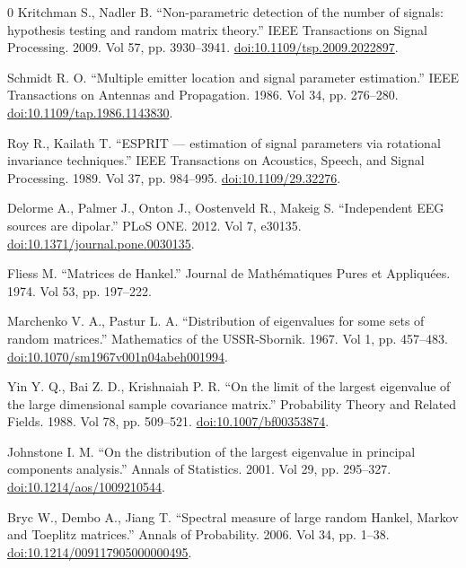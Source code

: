 \documentclass{article}
\begin{document}
\begin{thebibliography}{0}
 Kritchman S., Nadler B. ``Non-parametric detection of the number of signals: hypothesis testing and random matrix theory.'' IEEE Transactions on Signal Processing. 2009. Vol 57, pp. 3930--3941. \href{https://doi.org/10.1109/tsp.2009.2022897}{doi:10.1109/tsp.2009.2022897}.

 Schmidt R. O. ``Multiple emitter location and signal parameter estimation.'' IEEE Transactions on Antennas and Propagation. 1986. Vol 34, pp. 276--280. \href{https://doi.org/10.1109/tap.1986.1143830}{doi:10.1109/tap.1986.1143830}.

 Roy R., Kailath T. ``ESPRIT --- estimation of signal parameters via rotational invariance techniques.'' IEEE Transactions on Acoustics, Speech, and Signal Processing. 1989. Vol 37, pp. 984--995. \href{https://doi.org/10.1109/29.32276}{doi:10.1109/29.32276}.

 Delorme A., Palmer J., Onton J., Oostenveld R., Makeig S. ``Independent EEG sources are dipolar.'' PLoS ONE. 2012. Vol 7, e30135. \href{https://doi.org/10.1371/journal.pone.0030135}{doi:10.1371/journal.pone.0030135}.

 Fliess M. ``Matrices de Hankel.'' Journal de Math\'ematiques Pures et Appliqu\'ees. 1974. Vol 53, pp. 197--222.

 Marchenko V. A., Pastur L. A. ``Distribution of eigenvalues for some sets of random matrices.'' Mathematics of the USSR-Sbornik. 1967. Vol 1, pp. 457--483. \href{https://doi.org/10.1070/sm1967v001n04abeh001994}{doi:10.1070/sm1967v001n04abeh001994}.

 Yin Y. Q., Bai Z. D., Krishnaiah P. R. ``On the limit of the largest eigenvalue of the large dimensional sample covariance matrix.'' Probability Theory and Related Fields. 1988. Vol 78, pp. 509--521. \href{https://doi.org/10.1007/bf00353874}{doi:10.1007/bf00353874}.

 Johnstone I. M. ``On the distribution of the largest eigenvalue in principal components analysis.'' Annals of Statistics. 2001. Vol 29, pp. 295--327. \href{https://doi.org/10.1214/aos/1009210544}{doi:10.1214/aos/1009210544}.

 Bryc W., Dembo A., Jiang T. ``Spectral measure of large random Hankel, Markov and Toeplitz matrices.'' Annals of Probability. 2006. Vol 34, pp. 1--38. \href{https://doi.org/10.1214/009117905000000495}{doi:10.1214/009117905000000495}.


\end{thebibliography}
\end{document}
